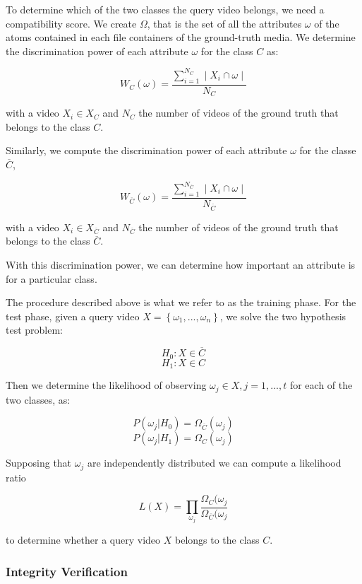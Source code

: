To determine which of the two classes the query video belongs, we need a compatibility score. We create $\Omega$, that is the set of all the attributes $\omega$ of the atoms contained in each file containers of the ground-truth media. We determine the discrimination power of each attribute $\omega$ for the class $C$ as:

$$  W_{C}(\omega) = \dfrac{\sum\limits_{i=1}^{N_{C}}\mid X_{i} \cap \omega \mid}{N_{C}} $$

with a video $X_{i} \in X_{C}$ and $N_{C}$ the number of videos of the ground truth that belongs to the class $C$.

Similarly, we compute the discrimination power of each attribute $\omega$ for the classe $\overline{C}$,

$$  W_{\overline{C}}(\omega) = \dfrac{\sum\limits_{i=1}^{N_{\overline{C}}}\mid X_{i} \cap \omega \mid}{N_{\overline{C}}} $$

with a video $X_{i} \in X_{\overline{C}}$ and $N_{\overline{C}}$ the number of videos of the ground truth that belongs to the class $\overline{C}$.

With this discrimination power, we can determine how important an attribute is for a particular class.

The procedure described above is what we refer to as the training phase. For the test phase, given a query video $X = \left\lbrace \omega_{1},...,\omega_{n} \right\rbrace  $, we solve the two hypothesis test problem:

$$  H_{0}:X \in \overline{C} $$
$$  H_{1}:X \in C $$

Then we determine the likelihood of observing $\omega_{j} \in X, j = 1,...,t$ for each of the two classes, as:

$$ P(\omega_{j}\vert H_{0}) = \Omega_{\overline{C}}(\omega_{j}) $$
$$ P(\omega_{j}\vert H_{1}) = \Omega_{C}(\omega_{j}) $$ 

Supposing that $\omega_{j}$ are independently distributed we can compute a likelihood ratio

\begin{equation}\label{eq:likelihood}
L(X) = \prod\limits_{\omega_{j}}\dfrac{\Omega_{C}(\omega_{j} }{\Omega_{\overline{C}}(\omega_{j}}
\end{equation}

to determine whether a query video $X$ belongs to the class $C$.

\subsubsection*{Integrity Verification}

